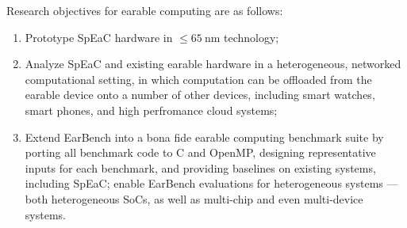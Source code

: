 Research objectives for earable computing are as follows:

\begin{enumerate}
\item Prototype SpEaC hardware in \(\leq \SI{65}{\nano\meter}\) technology;
\item Analyze SpEaC and existing earable hardware in a heterogeneous, networked
     computational setting, in which computation can be offloaded from the earable
     device onto a number of other devices, including smart watches, smart phones,
     and high perfromance cloud systems;
\item Extend EarBench into a bona fide earable computing benchmark suite by
    porting all benchmark code to C and OpenMP, designing representative inputs
    for each benchmark, and providing baselines on existing systems, including
    SpEaC; enable EarBench evaluations for heterogeneous systems --- both
    heterogeneous SoCs, as well as multi-chip and even multi-device systems.
\end{enumerate}
